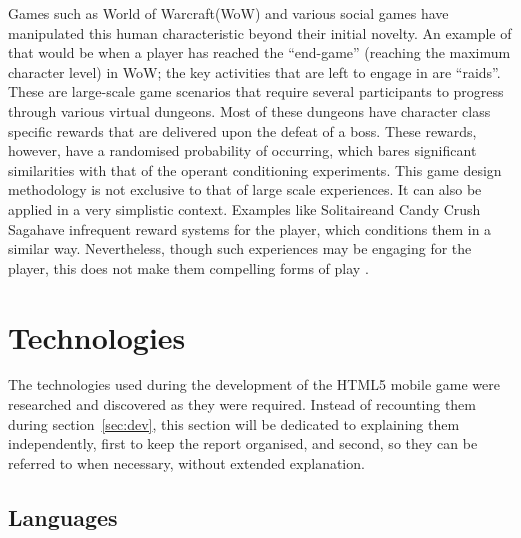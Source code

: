 \documentclass[final]{cmpreport}
\begin{document}
Games such as World of Warcraft\footnotemark[3] (WoW) and various social games have manipulated this human characteristic beyond their initial novelty. An example of that would be when a player has reached the ``end-game'' (reaching the maximum character level) in WoW; the key activities that are left to engage in are ``raids''. These are large-scale game scenarios that require several participants to progress through various virtual dungeons. Most of these dungeons have character class specific rewards that are delivered upon the defeat of a boss. These rewards, however, have a randomised probability of occurring, which bares significant similarities with that of the operant conditioning experiments. This game design methodology is not exclusive to that of large scale experiences. It can also be applied in a very simplistic context. Examples like Solitaire\footnotemark[4] and Candy Crush Saga\footnotemark[5] have infrequent reward systems for the player, which conditions them in a similar way. Nevertheless, though such experiences may be engaging for the player, this does not make them compelling forms of play \citep{ExtraCredits}.


\section{Technologies}
The technologies used during the development of the HTML5 mobile game were researched and discovered as they were required. Instead of recounting them during section~\ref{sec:dev}, this section will be dedicated to explaining them independently, first to keep the report organised, and second, so they can be referred to when necessary, without extended explanation.

\subsection{Languages}
\end{document}
